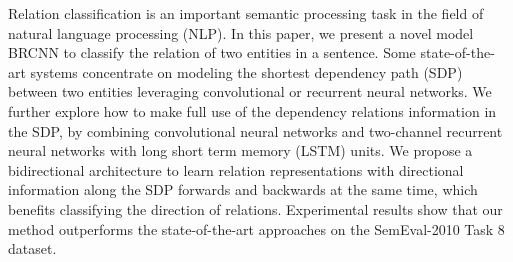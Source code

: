 Relation classification is an important semantic processing task in the field of natural language processing (NLP). In this paper, we present a novel model BRCNN to classify the relation of two entities in a sentence. Some state-of-the-art systems concentrate on modeling the shortest dependency path (SDP) between two entities leveraging convolutional or recurrent neural networks. We further explore how to make full use of the dependency relations information in  the SDP,  by combining convolutional neural networks and two-channel recurrent neural networks with long short term memory (LSTM) units. We propose a bidirectional architecture to learn relation representations with directional information along the SDP forwards and backwards at the same time, which benefits classifying the direction of relations. Experimental results show that our method outperforms the state-of-the-art approaches on the SemEval-2010 Task 8 dataset.

